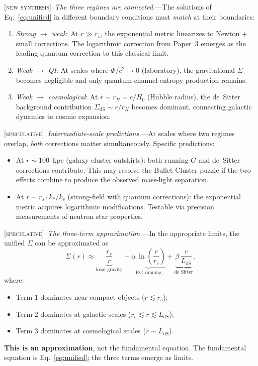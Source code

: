 \documentclass[prl,twocolumn,superscriptaddress,longbibliography,floatfix]{revtex4-2}
\newcommand{\newsyn}{\textsc{[new synthesis]}}
\newcommand{\spec}{\textsc{[speculative]}}
\begin{document}
\newsyn\ \emph{The three regimes are connected.}---The solutions of
Eq.~\eqref{eq:unified} in different boundary conditions must
\emph{match} at their boundaries:

\begin{enumerate}
\item \emph{Strong $\to$ weak}: At $r \gg r_s$, the exponential
  metric linearizes to Newton + small corrections. The logarithmic
  correction from Paper~3 emerges as the leading quantum correction
  to this classical limit.

\item \emph{Weak $\to$ QI}: At scales where $\Phi/c^2 \to 0$
  (laboratory), the gravitational $\Sigma$ becomes negligible and
  only quantum-channel entropy production remains.

\item \emph{Weak $\to$ cosmological}: At $r \sim r_H = c/H_0$
  (Hubble radius), the de~Sitter background contribution
  $\Sigma_{\mathrm{dS}} \sim r/r_H$ becomes dominant, connecting
  galactic dynamics to cosmic expansion.
\end{enumerate}

\spec\ \emph{Intermediate-scale predictions.}---At scales where
two regimes overlap, \emph{both} corrections matter simultaneously.
Specific predictions:
\begin{itemize}
\item At $r \sim 100$~kpc (galaxy cluster outskirts): both
  running-$G$ and de~Sitter corrections contribute. This may
  resolve the Bullet Cluster puzzle if the two effects combine
  to produce the observed mass-light separation.
\item At $r \sim r_s \cdot k_*/k_s$ (strong-field with quantum
  corrections): the exponential metric acquires logarithmic
  modifications. Testable via precision measurements of
  neutron star properties.
\end{itemize}

\spec\ \emph{The three-term approximation.}---In the appropriate
limits, the unified $\Sigma$ can be approximated as
\begin{equation}
\Sigma(r) \approx \underbrace{\frac{r_s}{r}}_{\text{local gravity}}
  + \underbrace{\alpha\,\ln\!\left(\frac{r}{r_c}\right)}_{\text{RG running}}
  + \underbrace{\beta\,\frac{r}{L_{\mathrm{dS}}}}_{\text{de Sitter}},
\label{eq:three_term}
\end{equation}
where:
\begin{itemize}
\item Term 1 dominates near compact objects ($r \lesssim r_s$);
\item Term 2 dominates at galactic scales ($r_c \lesssim r \lesssim L_{\mathrm{dS}}$);
\item Term 3 dominates at cosmological scales ($r \sim L_{\mathrm{dS}}$).
\end{itemize}
\textbf{This is an approximation}, not the fundamental equation.
The fundamental equation is Eq.~\eqref{eq:unified}; the three
terms emerge as limits.
\end{document}
